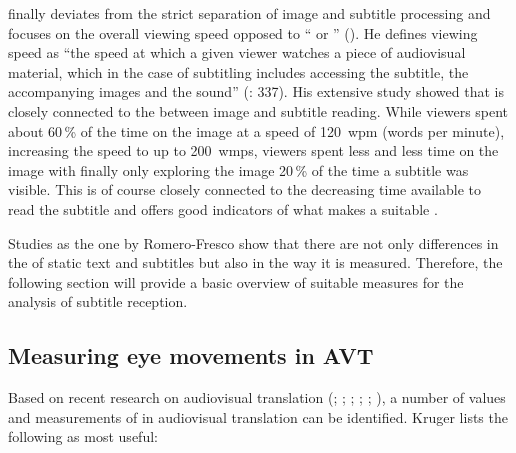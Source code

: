 \citet{romero-fresco2015} finally deviates from the strict separation of image and subtitle processing and focuses on the overall viewing speed opposed to “ or ” (\citealt{Kruger????}). He defines viewing speed as “the speed at which a given viewer watches a piece of audiovisual material, which in the case of subtitling includes accessing the subtitle, the accompanying images and the sound” (\citeyear{romero-fresco2015}: 337). His extensive  study showed that  is closely connected to the  between image and subtitle reading. While viewers spent about 60\,\% of the time on the image at a speed of 120~wpm (words per minute), increasing the speed to up to 200~wmps, viewers spent less and less time on the image with finally only exploring the image 20\,\% of the time a subtitle was visible. This is of course closely connected to the decreasing time available to read the subtitle and offers good indicators of what makes a suitable .

Studies as the one by Romero-Fresco show that there are not only differences in the  of static text and subtitles but also in the way it is measured. Therefore, the following section will provide a basic overview of suitable  measures for the analysis of subtitle reception.

\subsection{Measuring eye movements in AVT}\label{sec:6.3.1}

Based on recent  research on audiovisual translation (\citealt{Dydewalle1991}; \citealt{Dydewalle2007}; \citealt{moran2008}; \citealt{Caffrey2009}; \citealt{Ghia2012}; \citealt{Kruger2014}), a number of values and measurements of  in audiovisual translation can be identified. Kruger lists the following as most useful:

